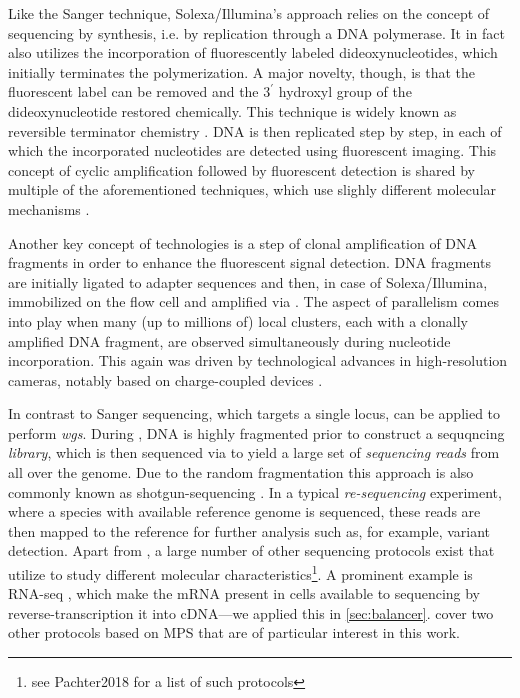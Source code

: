 Like the Sanger technique, Solexa/Illumina’s approach relies on the concept of
sequencing by synthesis, i.e. by replication through a DNA polymerase. It in
fact also utilizes the incorporation of fluorescently labeled dideoxynucleotides,
which initially terminates the polymerization. A major novelty, though, is that
the fluorescent label can be removed and the $3^\prime$ hydroxyl group of the
dideoxynucleotide restored chemically. This technique is widely known as
reversible terminator chemistry \citep{Turcatti2008}. DNA is then replicated
step by step, in each of which the incorporated nucleotides are detected using
fluorescent imaging. This concept of cyclic amplification followed by
fluorescent detection is shared by multiple of the aforementioned techniques,
which use slighly different molecular mechanisms \citep{Shendure2008}.

Another key concept of \mps technologies is a step of clonal amplification of
DNA fragments in order to enhance the fluorescent signal detection. DNA
fragments are initially ligated to adapter sequences and then, in case of
Solexa/Illumina, immobilized on the flow cell and amplified via
    \citep{Mullis1990}.
The aspect of parallelism comes into play when many (up to millions of) local
clusters, each with a clonally amplified DNA fragment, are observed
simultaneously during nucleotide incorporation. This again was driven by
technological advances in high-resolution cameras, notably based on
charge-coupled devices \citep{Barbe1975,Shendure2008}.


In contrast to Sanger sequencing, which targets a single locus, \mps can be
applied to perform \emph{\acf{wgs}}. During \wgs, DNA is highly fragmented prior
to construct a sequqncing \emph{library}, which is then sequenced via \mps to
yield a large set of \emph{sequencing reads} from
all over the genome. Due to the random fragmentation this approach is also
commonly known as shotgun-sequencing \citep{Weber1997}. In a typical
\emph{re-sequencing} experiment, where a species with available reference genome
is sequenced, these reads are then mapped to the reference for further analysis
such as, for example, variant detection. Apart from \wgs, a large number of
other sequencing protocols exist that utilize \mps to study different molecular
characteristics\footnote{see Pachter2018 for a list of such protocols}.
A prominent example is RNA-seq \citep{Morin2008,Wang2009},
which make the mRNA present in cells available to sequencing by
reverse-transcription it into cDNA---we applied this in \cref{sec:balancer}.
 cover two other protocols based on MPS that are
of particular interest in this work.

